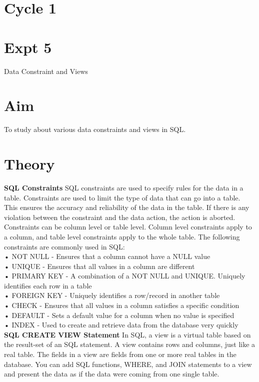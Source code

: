 \documentclass[13pt,oneside]{book}
\begin{document}
				\section*{Cycle 1}
				\section*{Expt 5}
				\begin{center}
					\Large{Data Constraint and Views}
				\end{center}
				
				\section*{Aim}
				\large To study about various data constraints and views in SQL.
				\section*{Theory}
				\textbf{SQL Constraints}
SQL constraints are used to specify rules for the data in a table.
Constraints are used to limit the type of data that can go into a table. This ensures
the accuracy and reliability of the data in the table. If there is any violation between
the constraint and the data action, the action is aborted.
Constraints can be column level or table level. Column level constraints apply to a
column, and table level constraints apply to the whole table. The following constraints
are commonly used in SQL:\\
• NOT NULL - Ensures that a column cannot have a NULL value\\
• UNIQUE - Ensures that all values in a column are different\\
• PRIMARY KEY - A combination of a NOT NULL and UNIQUE. Uniquely identifies each row in a table\\
• FOREIGN KEY - Uniquely identifies a row/record in another table\\
• CHECK - Ensures that all values in a column satisfies a specific condition\\
• DEFAULT - Sets a default value for a column when no value is specified\\
• INDEX - Used to create and retrieve data from the database very quickly\\
\textbf{SQL CREATE VIEW Statement}
In SQL, a view is a virtual table based on the result-set of an SQL statement.
A view contains rows and columns, just like a real table. The fields in a view are
fields from one or more real tables in the database.
You can add SQL functions, WHERE, and JOIN statements to a view and present
the data as if the data were coming from one single table.
\end{document}

